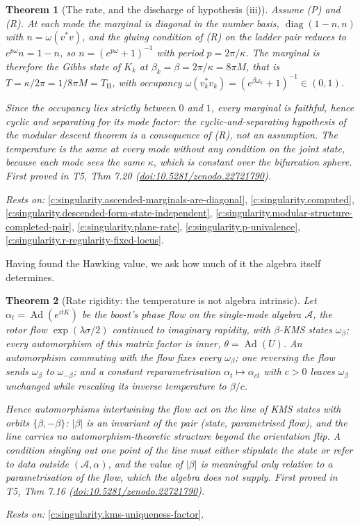 \documentclass[11pt]{article}
\newtheorem{theorem}{Theorem}[section]
\theoremstyle{definition}
\theoremstyle{plain}
\providecommand{\Aa}{}\renewcommand{\Aa}{\mathcal{A}}
\providecommand{\TH}{}\renewcommand{\TH}{T_{\mathrm{H}}}
\begin{document}
\begin{theorem}[The rate, and the discharge of hypothesis (iii)]\label{c:singularity.rate-discharge-hypothesis-iii}
Assume (P) and (R). At each mode the marginal is diagonal in the number basis, $\operatorname{diag}(1 - n, n)$ with $n = \omega(v^*v)$, and the gluing condition of (R) on the ladder pair reduces to $e^{p\omega}n = 1 - n$, so $n = (e^{p\omega} + 1)^{-1}$ with period $p = 2\pi/\kappa$. The marginal is therefore the Gibbs state of $K_k$ at $\beta_k = \beta = 2\pi/\kappa = 8\pi M$, that is $T = \kappa/2\pi = 1/8\pi M = \TH$, with occupancy $\omega(v_k^*v_k) = (e^{\beta\omega_k} + 1)^{-1} \in (0,1)$.

Since the occupancy lies strictly between $0$ and $1$, every marginal is faithful, hence cyclic and separating for its mode factor: the cyclic-and-separating hypothesis of the modular descent theorem is a consequence of (R), not an assumption. The temperature is the same at every mode without any condition on the joint state, because each mode sees the same $\kappa$, which is constant over the bifurcation sphere.
\emph{First proved in} T5, Thm 7.20 (\href{https://doi.org/10.5281/zenodo.22721790}{doi:10.5281/zenodo.22721790}).
\end{theorem}
\noindent\emph{Rests on:} \ref{c:singularity.ascended-marginals-are-diagonal}, \ref{c:singularity.computed}, \ref{c:singularity.descended-form-state-independent}, \ref{c:singularity.modular-structure-completed-pair}, \ref{c:singularity.plane-rate}, \ref{c:singularity.p-univalence}, \ref{c:singularity.r-regularity-fixed-locus}.

Having found the Hawking value, we ask how much of it the algebra itself determines.

\begin{theorem}[Rate rigidity: the temperature is not algebra intrinsic]\label{c:singularity.rate-rigidity-temperature-not-algebra-intrinsic}
Let $\alpha_t = \operatorname{Ad}(e^{itK})$ be the boost's phase flow on the single-mode algebra $\Aa$, the rotor flow $\exp(\lambda\sigma/2)$ continued to imaginary rapidity, with $\beta$-KMS states $\omega_\beta$; every automorphism of this matrix factor is inner, $\theta = \operatorname{Ad}(U)$. An automorphism commuting with the flow fixes every $\omega_\beta$; one reversing the flow sends $\omega_\beta$ to $\omega_{-\beta}$; and a constant reparametrisation $\alpha_t \mapsto \alpha_{ct}$ with $c > 0$ leaves $\omega_\beta$ unchanged while rescaling its inverse temperature to $\beta/c$.

Hence automorphisms intertwining the flow act on the line of KMS states with orbits $\{\beta, -\beta\}$: $|\beta|$ is an invariant of the pair (state, parametrised flow), and the line carries no automorphism-theoretic structure beyond the orientation flip. A condition singling out one point of the line must either stipulate the state or refer to data outside $(\Aa, \alpha)$, and the value of $|\beta|$ is meaningful only relative to a parametrisation of the flow, which the algebra does not supply.
\emph{First proved in} T5, Thm 7.16 (\href{https://doi.org/10.5281/zenodo.22721790}{doi:10.5281/zenodo.22721790}).
\end{theorem}
\noindent\emph{Rests on:} \ref{c:singularity.kms-uniqueness-factor}.
\end{document}
